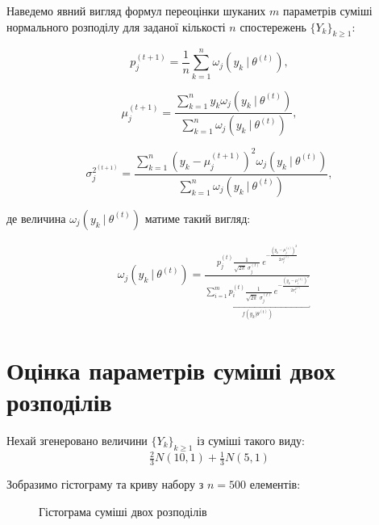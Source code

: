 \documentclass[a4paper,14pt]{extarticle} %
\numberwithin{equation}{section}
\begin{document}
Наведемо явний вигляд формул переоцінки шуканих $m$ параметрів суміші нормального розподілу для заданої кількості $n$ спостережень $\{Y_k\}_{k\geqslant 1}$:

\[ p_j^{(t+1)}=\frac{1}{n}\sum\limits_{k=1}^n\omega_j(y_k \ |\ \theta^{(t)}), \]

\[ \mu_j^{(t+1)}=\frac{\sum\limits_{k=1}^n y_k \omega_j(y_k \ |\ \theta^{(t)})}
{\sum\limits_{k=1}^n \omega_j(y_k \ |\ \theta^{(t)})}, \]

\[ \sigma_j^{2^{(t+1)}}=\frac{\sum\limits_{k=1}^n (y_k-\mu_j^{(t+1)})^2 \omega_j(y_k \ |\ \theta^{(t)})}
{\sum\limits_{k=1}^n \omega_j(y_k \ |\ \theta^{(t)})}, \]

де величина $\omega_j(y_k \ |\ \theta^{(t)})$ матиме такий вигляд:

\begin{align*}
    &\omega_j(y_k \ |\ \theta^{(t)})=
    \frac{p_j^{(t)} \tfrac{1}{\sqrt{2\pi}\; \sigma_j^{(t)}}\ e^{-\tfrac{(y_k-\mu_j^{(t)})^2}{2\sigma_j^{2^{(t)}}}}}
    {\underbracket{\sum\limits_{i=1}^m p_i^{(t)} \tfrac{1}{\sqrt{2\pi}\; \sigma_j^{(t)}}\ e^{-\tfrac{(y_k-\mu_i^{(t)})^2}
    {2\sigma_i^{2^{(t)}}}}}_{f(y_k | \theta^{(t)})}}
\end{align*}

\section*{Оцінка параметрів суміші двох розподілів}

Нехай згенеровано величини $\{Y_k\}_{k\geqslant 1}$ із суміші такого виду:
\[ \tfrac{2}{3}N(10,1) + \tfrac{1}{3}N(5,1) \]

Зобразимо гістограму та криву набору з $n=500$ елементів:

\begin{figure}[H]
    \caption{Гістограма суміші двох розподілів}
    \label{figure: 2input histogram}
\end{figure}
\end{document}

